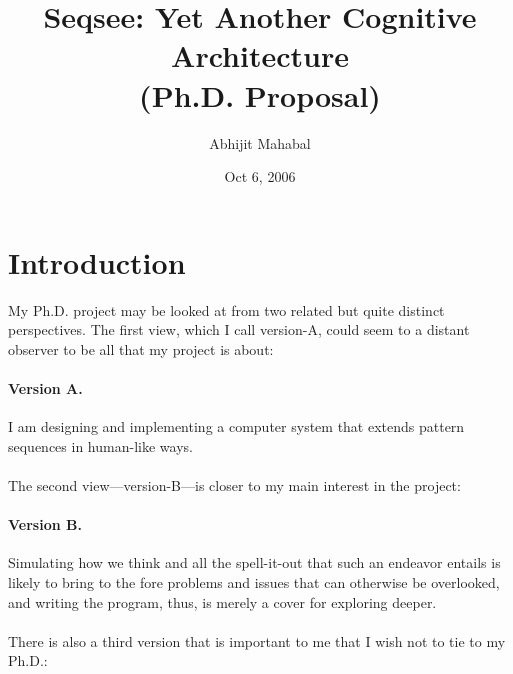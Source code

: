 \documentclass[letterpaper]{article}
\begin{document}
\title{Seqsee: Yet Another Cognitive Architecture\\{(Ph.D. Proposal)}}
\author{Abhijit Mahabal}
\date{Oct 6, 2006}
\maketitle

\renewcommand{\baselinestretch}{1.5}\small
\newcommand{\sequence}[1]{`\emph{#1 }{\ensuremath\ldots}'\xspace}

\section*{Introduction}
\label{sec:intro}

\newcommand{\V}[1]{version-#1\xspace}
\newcommand{\hof}{Hofstadter\xspace}
\newcommand{\dan}{Dan Dennett\xspace}
\newcommand{\andy}{Andy Clark\xspace}
\newcommand{\seq}{Seqsee\xspace}
\newcommand{\tofillout}[1]{[Need to fill gap: #1\index{Gaps!#1}]}


My Ph.D. project may be looked at from two related but quite distinct perspectives.  The first view, which I call \V{A}, could seem to a distant observer to be all that my project is about:

\paragraph{Version A.} I am designing and implementing a computer system that extends pattern sequences in human-like ways.

\paragraph{} The second view---\V{B}---is closer to my main interest in the project:

\paragraph{Version B.} Simulating how we think and all the spell-it-out that such an endeavor entails is likely to bring to the fore problems and issues that can otherwise be overlooked, and writing the program, thus, is merely a cover for  exploring deeper.

\paragraph{} There is also a third version that is important to me that I wish not to tie to my Ph.D.:
\end{document}

